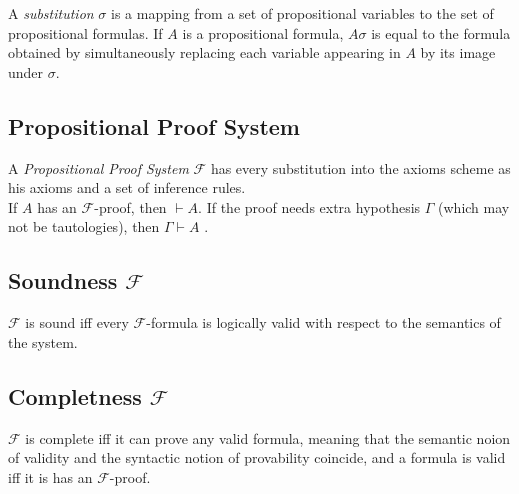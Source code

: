 \documentclass[a4paper]{article}
\newcommand\vdashsub[1]{\mathrel{\stackengine{.4ex}{\vdash}{\;\;\scriptscriptstyle#1}{U}{c}{F}{T}{L}}}
\begin{document}
A \textit{substitution} \(\sigma\)
is a mapping from a set of propositional variables
to the set of propositional formulas.
If \(A\) is a propositional formula, \(A\sigma\)
is equal to the formula obtained by simultaneously
replacing each variable appearing in \(A\)
by its image under \(\sigma\).

\subsection{Propositional Proof System}

A \textit{Propositional Proof System}
\(\mathcal{F}\) has every substitution into the
axioms scheme as his axioms and a set of inference rules.
\\
If \(A\) has an \(\mathcal{F}\)-proof,
then \(\vdash A\). %
If the proof needs extra hypothesis \(\Gamma\)
(which may not be tautologies), then \(\Gamma\vdash A\)
.%

\subsection{Soundness \(\mathcal{F}\)}

\(\mathcal{F}\) is sound iff every \(\mathcal{F}\)-formula is logically valid with respect to the semantics of the system. 

\subsection{Completness \(\mathcal{F}\)}

\(\mathcal{F}\) is complete iff
it can prove any valid formula, meaning that
the semantic noion of validity
and the syntactic notion of provability coincide,
and a formula is valid iff it is has an
\(\mathcal{F}\)-proof.
\end{document}
